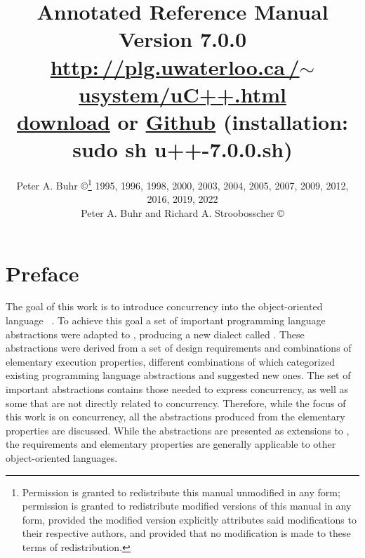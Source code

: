 \documentclass[openright,twoside]{report}
\newcommand{\Version}{7.0.0}
\begin{document}

\pagestyle{headings}

\title{\huge \bf
\uC Annotated Reference Manual \\
\vspace{1in}
\LARGE Version \Version \\
\vspace{1in}
\href{http://plg.uwaterloo.ca/~usystem/uC++.html}{\textsf{http:\,//\hspace{0.1ex}plg.uwaterloo.ca\,/$\sim$usystem/uC++.html}} \\
\vspace{0.125in}
\href{http://plg.uwaterloo.ca/~usystem/pub/uSystem/u++-7.0.0.sh}{\uC download} or \href{https://github.com/pabuhr/uCPP}{Github} (installation: \textsf{sudo sh u++-7.0.0.sh}) \\
} %
\author{
\large Peter A. Buhr \copyright\thanks{\normalsize
Permission is granted to redistribute this manual unmodified in any form;
permission is granted to redistribute modified versions of this	manual in any form, provided the modified version explicitly attributes said modifications to their respective authors, and provided that no modification is made to these terms of redistribution.
} 1995, 1996, 1998, 2000, 2003, 2004, 2005, 2007, 2009, 2012, 2016, 2019, 2022 \\
Peter A. Buhr and Richard A. Stroobosscher \copyright{} \\
} %

\maketitle
\thispagestyle{empty}				%
\cleardoublepage					%
\tableofcontents
\cleardoublepage					%


\chapter*{Preface}

The goal of this work is to introduce concurrency into the object-oriented language \CC~\cite{C++:V3}.
To achieve this goal a set of important programming language abstractions were adapted to \CC, producing a new dialect called \uC.
These abstractions were derived from a set of design requirements and combinations of elementary execution properties, different combinations of which categorized existing programming language abstractions and suggested new ones.
The set of important abstractions contains those needed to express concurrency, as well as some that are not directly related to concurrency.
Therefore, while the focus of this work is on concurrency, all the abstractions produced from the elementary properties are discussed.
While the abstractions are presented as extensions to \CC, the requirements and elementary properties are generally applicable to other object-oriented languages.
\end{document}
